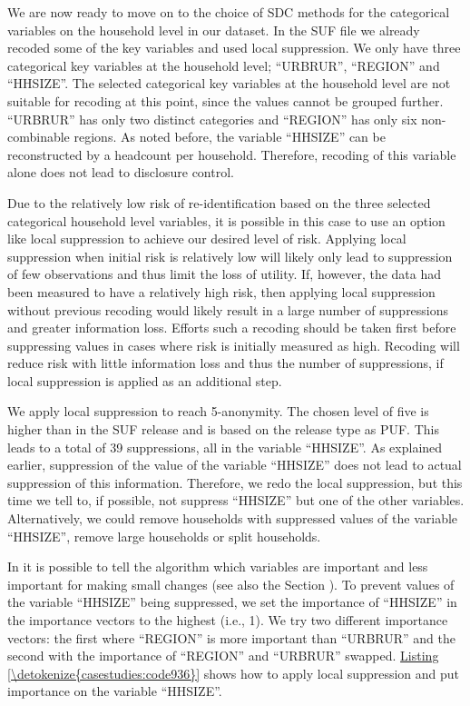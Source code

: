 \documentclass[letterpaper,10pt,english]{sphinxmanual}
\begin{document}

We are now ready to move on to the choice of SDC methods for the
categorical variables on the household level in our dataset. In the SUF
file we already recoded some of the key variables and used local
suppression. We only have three categorical key variables at the
household level; “URBRUR”, “REGION” and “HHSIZE”. The selected
categorical key variables at the household level are not suitable for
recoding at this point, since the values cannot be grouped further.
“URBRUR” has only two distinct categories and “REGION” has only six
non-combinable regions. As noted before, the variable “HHSIZE” can be
reconstructed by a headcount per household. Therefore, recoding of this
variable alone does not lead to disclosure control.

Due to the relatively low risk of re-identification based on the three
selected categorical household level variables, it is possible in this
case to use an option like local suppression to achieve our desired
level of risk. Applying local suppression when initial risk is
relatively low will likely only lead to suppression of few observations
and thus limit the loss of utility. If, however, the data had been
measured to have a relatively high risk, then applying local suppression
without previous recoding would likely result in a large number of
suppressions and greater information loss. Efforts such a recoding
should be taken first before suppressing values in cases where risk is
initially measured as high. Recoding will reduce risk with little
information loss and thus the number of suppressions, if local
suppression is applied as an additional step.

We apply local suppression to reach 5-anonymity. The chosen level of
five is higher than in the SUF release and is based on the release type
as PUF. This leads to a total of 39 suppressions, all in the variable
“HHSIZE”. As explained earlier, suppression of the value of the variable
“HHSIZE” does not lead to actual suppression of this information.
Therefore, we redo the local suppression, but this time we tell
 to, if possible, not suppress “HHSIZE” but one of the other
variables. Alternatively, we could remove households with suppressed
values of the variable “HHSIZE”, remove large households or split
households.

In  it is possible to tell the algorithm which variables are
important and less important for making small changes (see also the Section
).
To prevent values of the variable “HHSIZE” being suppressed, we
set the importance of “HHSIZE” in the importance vectors to the highest
(i.e., 1). We try two different importance vectors: the first where
“REGION” is more important than “URBRUR” and the second with the
importance of “REGION” and “URBRUR” swapped. \hyperref[\detokenize{casestudies:code936}]{Listing \ref{\detokenize{casestudies:code936}}} shows how to
apply local suppression and put importance on the variable “HHSIZE”.
\end{document}
